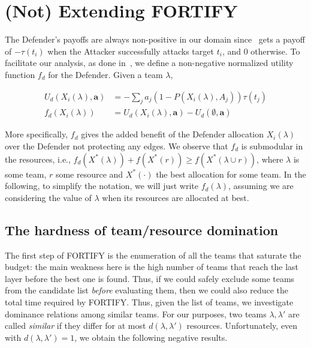 \section{(Not) Extending FORTIFY}\label{sec:exact_app}
The Defender's payoffs are always non-positive in our domain since \Def~gets a payoff of $-\tau(t_i)$ when the Attacker successfully attacks target $t_i$, and $0$ otherwise. To facilitate our analysis, as done in~\cite{jain2013security}, we define a non-negative normalized utility function $f_d$ for the Defender. Given a team $\lambda$,

\begin{align*}
U_d(X_i(\lambda),\textbf{a}) &= -\sum_j a_j(1-P(X_i(\lambda),A_j))\tau(t_j)\\
f_d(X_i(\lambda)) &= U_d(X_i(\lambda),\textbf{a}) - U_d(\emptyset,\textbf{a})
\end{align*}

More specifically, $f_d$ gives the added benefit of the Defender allocation $X_i(\lambda)$ over the Defender not protecting any edges. We observe that $f_d$ is submodular in the resources, i.e., $f_d(X^*(\lambda)) + f(X^*(r)) \geq f(X^*(\lambda \cup r))$, where $\lambda$ is some team, $r$ some resource and $X^*(\cdot)$ the best allocation for some team. In the following, to simplify the notation, we will just write $f_d(\lambda)$, assuming we are considering the value of $\lambda$ when its resources are allocated at best.



\subsection{The hardness of team/resource domination}
The first step of FORTIFY is the enumeration of all the teams that saturate the budget: the main weakness here is the high number of teams that reach the last layer before the best one is found. Thus, if we could safely exclude some teams from the candidate list \textit{before} evaluating them, then we could also reduce the total time required by FORTIFY. Thus, given the list of teams, we investigate dominance relations among similar teams. For our purposes, two teams $\lambda, \lambda'$ are called \textit{similar} if they differ for at most $d(\lambda, \lambda')$ resources. Unfortunately, even with $d(\lambda, \lambda') = 1$, we obtain the following negative results.

